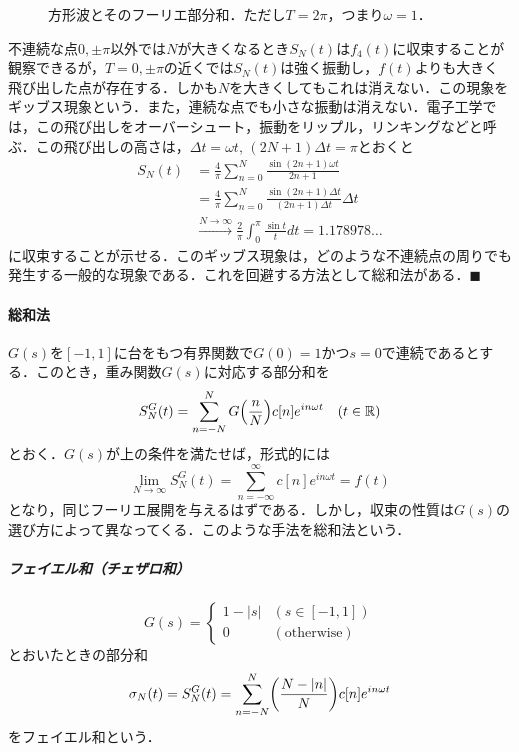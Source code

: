 \documentclass[dvipdfmx,a4j,10pt]{jsarticle}
\theoremstyle{mystyle1}
\theoremstyle{mystyle3}
\theoremstyle{mystyle4}
\theoremstyle{mystyle2}
\renewcommand{\qedsymbol}{\hfill\ensuremath{\blacksquare}}
\begin{document}
\begin{figure}
    \begin{center}
        
    \end{center}
    \caption{方形波とそのフーリエ部分和．ただし$T=2\pi$，つまり$\omega=1$．}
    \label{fig:ex1-4}
\end{figure}

不連続な点$0,\pm\pi$以外では$N$が大きくなるとき$S_N(t)$は$f_4(t)$に収束することが観察できるが，$T=0,\pm\pi$の近くでは$S_N(t)$は強く振動し，$f(t)$よりも大きく飛び出した点が存在する．しかも$N$を大きくしてもこれは消えない．この現象をギッブス現象という．また，連続な点でも小さな振動は消えない．電子工学では，この飛び出しをオーバーシュート，振動をリップル，リンキングなどと呼ぶ．この飛び出しの高さは，$\Delta t=\omega t,\, (2N+1)\Delta t=\pi$とおくと
\[
    \begin{split}
        S_N(t)
        &=\frac{4}{\pi}\sum_{n=0}^N \frac{\sin(2n+1)\omega t}{2n+1} \\
        &=\frac{4}{\pi}\sum_{n=0}^N \frac{\sin(2n+1)\Delta t}{(2n+1)\Delta t}\Delta t \\
        &\overset{N\to\infty}{\longrightarrow}\frac{2}{\pi}\int_0^\pi \frac{\sin t}{t}dt=1.178978\ldots
    \end{split}
\]
に収束することが示せる．このギッブス現象は，どのような不連続点の周りでも発生する一般的な現象である．これを回避する方法として総和法がある．\qedsymbol

\paragraph{総和法}

$G(s)$を$[-1,1]$に台をもつ有界関数で$G(0)=1$かつ$s=0$で連続であるとする．このとき，重み関数$G(s)$に対応する部分和を
\[
    S_N^G(t)=\sum_{n=-N}^N G\mleft(\frac{n}{N}\mright)c[n]e^{in\omega t}\quad(t\in\mathbb{R})
\]
とおく．$G(s)$が上の条件を満たせば，形式的には
\[
    \lim_{N\to\infty} S_N^G(t)=\sum_{n=-\infty}^\infty c[n]e^{in\omega t}=f(t)
\]
となり，同じフーリエ展開を与えるはずである．しかし，収束の性質は$G(s)$の選び方によって異なってくる．このような手法を総和法という．

\subparagraph{フェイエル和（チェザロ和）}
\[
    G(s)=\begin{cases}
        1-|s| & (s\in[-1,1])         \\
        0     & (\textrm{otherwise})
    \end{cases}
\]
とおいたときの部分和
\[
    \sigma_N(t)=S_N^G(t)=\sum_{n=-N}^N\mleft(\frac{N-|n|}{N}\mright)c[n]e^{in\omega t}
\]
をフェイエル和という．
\end{document}
